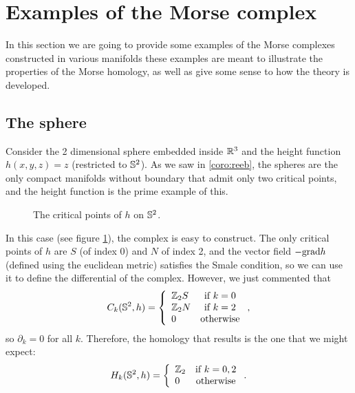 \section{Examples of the Morse complex} \label{section:morse_examples}

In this section we are going to provide some examples of the Morse complexes constructed in various manifolds these examples are meant to illustrate the properties of the Morse homology, as well as give some sense to how the theory is developed.

\subsection{The sphere}

\begin{exmpl}
Consider the 2 dimensional sphere embedded inside $\mathbb{R}^3$ and the height function $h(x,y,z) = z$ (restricted to $\mathbb{S}^2$). As we saw in \ref{coro:reeb}, the spheres are the only compact manifolds without boundary that admit only two critical points, and the height function is the prime example of this.

\begin{figure}[h]
	\centering
	
	\caption{The critical points of $h$ on $\mathbb{S}^2$.}
	\label{figure:example1}
\end{figure}

In this case (see figure \ref{figure:example1}), the complex is easy to construct. The only critical points of $h$ are $S$ (of index 0) and $N$ of index 2, and the vector field $- \mathrm{grad} h$ (defined using the euclidean metric) satisfies the Smale condition, so we can use it to define the differential of the complex. However, we just commented that
\[C_k(\mathbb{S}^2,h) = \left\{ \begin{array}{lc} \mathbb{Z}_2 S & \text{if } k=0 \\ \mathbb{Z}_2 N & \text{if } k=2 \\ 0 & \text{otherwise} \end{array} \right. ,\]
so $\partial_k = 0$ for all $k$. Therefore, the homology that results is the one that we might expect:
\[H_k(\mathbb{S}^2,h) = \left\{ \begin{array}{lc} \mathbb{Z}_2 & \text{if } k=0,2 \\ 0 & \text{otherwise} \end{array} \right. .\]
\end{exmpl}

